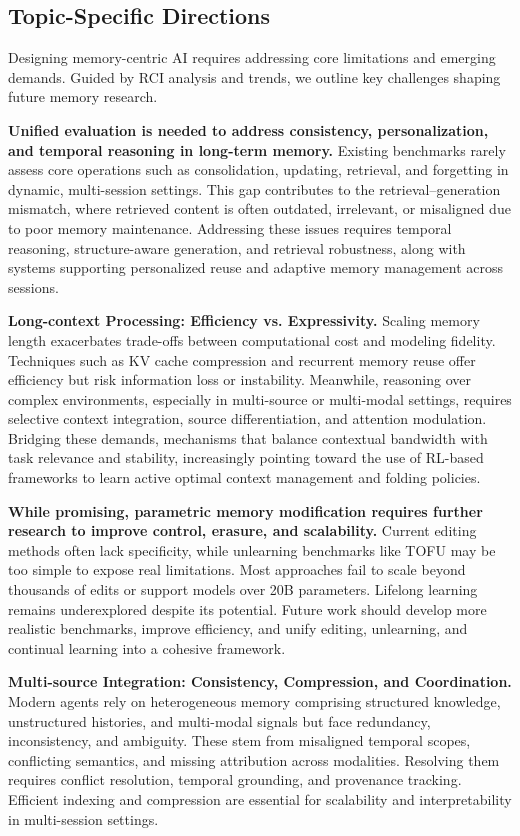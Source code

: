 \documentclass[manuscript,screen]{acmart}
\begin{document}
\subsection{Topic-Specific Directions}
Designing memory-centric AI requires addressing core limitations and emerging demands. Guided by RCI analysis and trends, we outline key challenges shaping future memory research.

\textbf{Unified evaluation is needed to address consistency, personalization, and temporal reasoning in long-term memory.} Existing benchmarks rarely assess core operations such as consolidation, updating, retrieval, and forgetting in dynamic, multi-session settings. This gap contributes to the retrieval–generation mismatch, where retrieved content is often outdated, irrelevant, or misaligned due to poor memory maintenance. Addressing these issues requires temporal reasoning, structure-aware generation, and retrieval robustness, along with systems supporting personalized reuse and adaptive memory management across sessions.

\textbf{Long-context Processing: Efficiency vs. Expressivity.} Scaling memory length exacerbates trade-offs between computational cost and modeling fidelity. Techniques such as KV cache compression and recurrent memory reuse offer efficiency but risk information loss or instability. Meanwhile, reasoning over complex environments, especially in multi-source or multi-modal settings, requires selective context integration, source differentiation, and attention modulation. Bridging these demands, mechanisms that balance contextual bandwidth with task relevance and stability, increasingly pointing toward the use of RL-based frameworks to learn active optimal context management and folding policies.

\textbf{While promising, parametric memory modification requires further research to improve control, erasure, and scalability.} Current editing methods often lack specificity, while unlearning benchmarks like TOFU may be too simple to expose real limitations. Most approaches fail to scale beyond thousands of edits or support models over 20B parameters. Lifelong learning remains underexplored despite its potential. Future work should develop more realistic benchmarks, improve efficiency, and unify editing, unlearning, and continual learning into a cohesive framework.

\textbf{Multi-source Integration: Consistency, Compression, and Coordination.} Modern agents rely on heterogeneous memory comprising structured knowledge, unstructured histories, and multi-modal signals but face redundancy, inconsistency, and ambiguity. These stem from misaligned temporal scopes, conflicting semantics, and missing attribution across modalities. Resolving them requires conflict resolution, temporal grounding, and provenance tracking. Efficient indexing and compression are essential for scalability and interpretability in multi-session settings.
\end{document}
